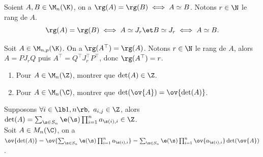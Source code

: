 \documentclass[11pt]{article}
\begin{document}
\begin{corr}{}{}
    Soient $A,B\in\M_n(\K)$, on a $\rg(A)=\rg(B) \iff A \simeq B$.
    \tcblower
    Notons $r\in\N$ le rang de $A$.
    \begin{equation*}
        \rg(A) = \rg(B) \iff A \simeq J_r \et B\simeq J_r \iff A \simeq B.
    \end{equation*}
\end{corr}


\vspace*{-0.7cm}

\begin{corr}{}{}
    Soit $A\in \M_{n,p}(\K)$. On a $\rg(A^\top)=\rg(A)$.
    \tcblower
    Notons $r\in\N$ le rang de $A$, alors $A=PJ_rQ$ puis $A^\top = Q^\top J_r^\top P^\top$, donc $\rg(A^\top)=r$.
\end{corr}



\begin{ex}{}{}
    \begin{enumerate}
        \item Pour $A\in\M_n(\Z)$, montrer que $\det(A)\in \Z$.
        \item Pour $A\in\M_n(\C)$, montrer que $\det(\ov{A})=\ov{\det(A)}$.
    \end{enumerate}
    \tcblower
     Supposons $\forall i \in \lb1,n\rb, ~ a_{i,j}\in\Z$, alors $\det(A)=\sum_{\s\in S_n}\e(\s)\prod_{i=1}^n a_{\s(i),i}\in\Z$.\\
     Soit $A\in M_n(\C)$, on a $\ov{\det(A)}=\ov{\sum_{\s\in S_n}\e(\s)\prod_{i=1}^na_{\s(i),i}}=\sum_{\s\in S_n}\e(\s)\prod_{i=1}^n\ov{a_{\s(i),i}}\det(\ov{A})$.
\end{ex}

\vspace*{-0.7cm}
\end{document}
